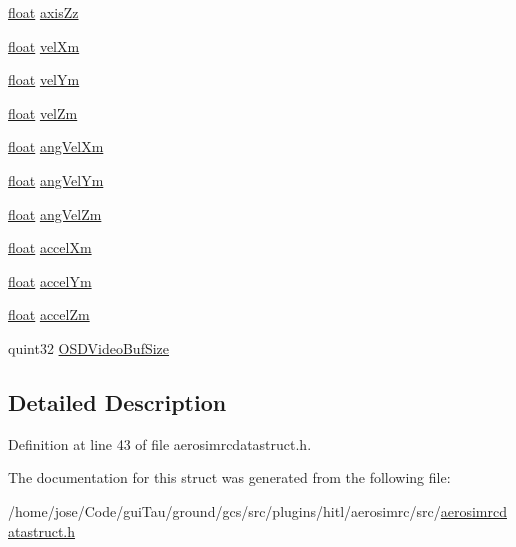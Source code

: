 \begin{DoxyCompactItemize}
\item 
\hyperlink{_super_l_u_support_8h_a6a1bb6ed41f44b60e7bd83b0e9945aa7}{float} \hyperlink{group___aero_sim_r_c_ga62dda20d79d63155064a31a27d06e930}{axis\-Zz}
\item 
\hyperlink{_super_l_u_support_8h_a6a1bb6ed41f44b60e7bd83b0e9945aa7}{float} \hyperlink{group___aero_sim_r_c_ga5b8ca52e6b6fcba33660c4164ff14b21}{vel\-Xm}
\item 
\hyperlink{_super_l_u_support_8h_a6a1bb6ed41f44b60e7bd83b0e9945aa7}{float} \hyperlink{group___aero_sim_r_c_ga78ba6a4d5b2134bed1c2396ff9212df0}{vel\-Ym}
\item 
\hyperlink{_super_l_u_support_8h_a6a1bb6ed41f44b60e7bd83b0e9945aa7}{float} \hyperlink{group___aero_sim_r_c_ga35865106b3179109ebbec06aed189fad}{vel\-Zm}
\item 
\hyperlink{_super_l_u_support_8h_a6a1bb6ed41f44b60e7bd83b0e9945aa7}{float} \hyperlink{group___aero_sim_r_c_gac5161f5332b6bc49ca097e2c27be8a22}{ang\-Vel\-Xm}
\item 
\hyperlink{_super_l_u_support_8h_a6a1bb6ed41f44b60e7bd83b0e9945aa7}{float} \hyperlink{group___aero_sim_r_c_ga1cdf55eb78da8c312e32d9d5be75afef}{ang\-Vel\-Ym}
\item 
\hyperlink{_super_l_u_support_8h_a6a1bb6ed41f44b60e7bd83b0e9945aa7}{float} \hyperlink{group___aero_sim_r_c_ga4387cb264fd400cd98815e6145b8114c}{ang\-Vel\-Zm}
\item 
\hyperlink{_super_l_u_support_8h_a6a1bb6ed41f44b60e7bd83b0e9945aa7}{float} \hyperlink{group___aero_sim_r_c_ga8e87f9c4846725309216b66cf48a4fdd}{accel\-Xm}
\item 
\hyperlink{_super_l_u_support_8h_a6a1bb6ed41f44b60e7bd83b0e9945aa7}{float} \hyperlink{group___aero_sim_r_c_gafb442cc82353fedd9b1a4b1f841a780a}{accel\-Ym}
\item 
\hyperlink{_super_l_u_support_8h_a6a1bb6ed41f44b60e7bd83b0e9945aa7}{float} \hyperlink{group___aero_sim_r_c_ga15b5242cd24b1253d8fa5a12d07e3b76}{accel\-Zm}
\item 
quint32 \hyperlink{group___aero_sim_r_c_ga9c59c8c051c445f8f8b17ed8b42a2820}{O\-S\-D\-Video\-Buf\-Size}
\end{DoxyCompactItemize}


\subsection{Detailed Description}


Definition at line 43 of file aerosimrcdatastruct.\-h.



The documentation for this struct was generated from the following file\-:\begin{DoxyCompactItemize}
\item 
/home/jose/\-Code/gui\-Tau/ground/gcs/src/plugins/hitl/aerosimrc/src/\hyperlink{aerosimrcdatastruct_8h}{aerosimrcdatastruct.\-h}\end{DoxyCompactItemize}
